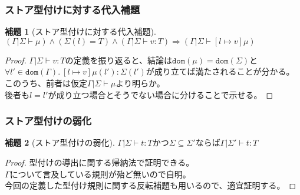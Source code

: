 \documentclass[dvipdfmx,cjk,xcolor=dvipsnames,envcountsect,notheorems]{beamer}
\theoremstyle{definition}
\newtheorem{lemma}{補題}
\begin{document}
\begin{frame}
	\frametitle{ストア型付けに対する代入補題}
	\Large
  \renewcommand{\thelemma}{13.5.5}
	\begin{lemma}[ストア型付けに対する代入補題]
		$(\Gamma | \Sigma \vdash \mu) \land (\Sigma(l)=T) \land (\Gamma | \Sigma \vdash v : T) \Rightarrow (\Gamma | \Sigma \vdash [l \mapsto v]\mu)$
	\end{lemma}
	\begin{proof}
		$\Gamma | \Sigma \vdash v : T$の定義を振り返ると、結論は$\texttt{dom}(\mu)=\texttt{dom}(\Sigma)$と$\forall l' \in \texttt{dom}(\Gamma).~[l \mapsto v]\mu (l') : \Sigma(l')$が成り立てば満たされることが分かる。\\
		このうち、前者は仮定$\Gamma | \Sigma \vdash \mu$より明らか。\\
		後者も$l=l'$が成り立つ場合とそうでない場合に分けることで示せる。
	\end{proof}
\end{frame}

\begin{frame}
	\frametitle{ストア型付けの弱化}
	\Large
  \renewcommand{\thelemma}{13.5.6}
	\begin{lemma}[ストア型付けの弱化]
		$\Gamma | \Sigma \vdash t : T$かつ$\Sigma \subseteq \Sigma'$ならば$\Gamma | \Sigma' \vdash t : T$
	\end{lemma}
	\begin{proof}
		型付けの導出に関する帰納法で証明できる。\\
		$\Gamma$について言及している規則が殆ど無いので自明。\\
		今回の定義した型付け規則に関する反転補題も用いるので、適宜証明する。
	\end{proof}
\end{frame}
\end{document}
